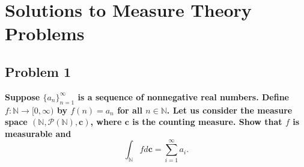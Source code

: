 \documentclass[11pt]{article}
\begin{document}
\section*{Solutions to Measure Theory Problems}

\subsection*{Problem 1}
\textbf{Suppose $\{a_n\}_{n=1}^\infty$ is a sequence of nonnegative real numbers. Define $f: \mathbb{N} \to [0, \infty)$ by $f(n) = a_n$ for all $n \in \mathbb{N}$. Let us consider the measure space $(\mathbb{N}, \mathcal{P}(\mathbb{N}), \mathbf{c})$, where $\mathbf{c}$ is the counting measure. Show that $f$ is measurable and}
\[ \int_{\mathbb{N}} f d\mathbf{c} = \sum_{i=1}^{\infty} a_i. \]
\end{document}
